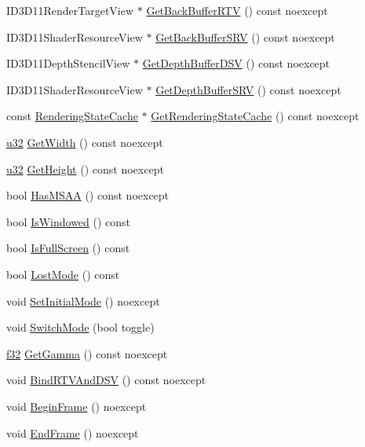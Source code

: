 \begin{DoxyCompactItemize}
\item 
I\+D3\+D11\+Render\+Target\+View $\ast$ \hyperlink{classmage_1_1_renderer_a19fed9809f31ff427440bbf6a167805e}{Get\+Back\+Buffer\+R\+TV} () const noexcept
\item 
I\+D3\+D11\+Shader\+Resource\+View $\ast$ \hyperlink{classmage_1_1_renderer_af0f19d31c5f01b79c2268128fde95206}{Get\+Back\+Buffer\+S\+RV} () const noexcept
\item 
I\+D3\+D11\+Depth\+Stencil\+View $\ast$ \hyperlink{classmage_1_1_renderer_a0e292945b845c16cc4fa113ecb6d14c5}{Get\+Depth\+Buffer\+D\+SV} () const noexcept
\item 
I\+D3\+D11\+Shader\+Resource\+View $\ast$ \hyperlink{classmage_1_1_renderer_a1e76970e43b0a4b734043f179d5f146d}{Get\+Depth\+Buffer\+S\+RV} () const noexcept
\item 
const \hyperlink{structmage_1_1_rendering_state_cache}{Rendering\+State\+Cache} $\ast$ \hyperlink{classmage_1_1_renderer_a69d87676ed67786935f4de9b86b60c8a}{Get\+Rendering\+State\+Cache} () const noexcept
\item 
\hyperlink{namespacemage_af2b398bf98eb10351f49cad73fe2cc73}{u32} \hyperlink{classmage_1_1_renderer_af360a0de9cfd16d14b6fdcbbe688cd4f}{Get\+Width} () const noexcept
\item 
\hyperlink{namespacemage_af2b398bf98eb10351f49cad73fe2cc73}{u32} \hyperlink{classmage_1_1_renderer_a19767d9a6853a7ab37d218fa0eb6ed27}{Get\+Height} () const noexcept
\item 
bool \hyperlink{classmage_1_1_renderer_a2ed9e9e39f01fa58769edd82ee1adcf8}{Has\+M\+S\+AA} () const noexcept
\item 
bool \hyperlink{classmage_1_1_renderer_a1de1804c1eedae7dc12435a520a10b9c}{Is\+Windowed} () const
\item 
bool \hyperlink{classmage_1_1_renderer_a5ae3220e19c68f47a8e4d55e3ced4694}{Is\+Full\+Screen} () const
\item 
bool \hyperlink{classmage_1_1_renderer_afdde83a1e2bc9288f000fb2575c525d0}{Lost\+Mode} () const
\item 
void \hyperlink{classmage_1_1_renderer_aff4e08af2ab697c53f1ede6546a86d19}{Set\+Initial\+Mode} () noexcept
\item 
void \hyperlink{classmage_1_1_renderer_a9004ab608659188900c808eacb5f873c}{Switch\+Mode} (bool toggle)
\item 
\hyperlink{namespacemage_a6a44ad388483959dc4dff9f2aef91431}{f32} \hyperlink{classmage_1_1_renderer_a12c0665b88d28d329d35535a49dabdac}{Get\+Gamma} () const noexcept
\item 
void \hyperlink{classmage_1_1_renderer_a97b7b1563939688072fa94341d29cc2c}{Bind\+R\+T\+V\+And\+D\+SV} () const noexcept
\item 
void \hyperlink{classmage_1_1_renderer_a3eadaa4b37cd9ad9a3da9f72879b0722}{Begin\+Frame} () noexcept
\item 
void \hyperlink{classmage_1_1_renderer_ac4b5290432db9c566c1accd98c311e0e}{End\+Frame} () noexcept
\end{DoxyCompactItemize}
